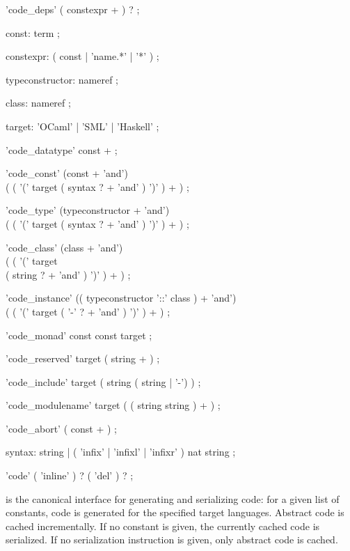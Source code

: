 \begin{isabellebody}
\begin{isamarkuptext}
\begin{rail}
    'code\_deps' ( constexpr + ) ?
    ;

    const: term
    ;

    constexpr: ( const | 'name.*' | '*' )
    ;

    typeconstructor: nameref
    ;

    class: nameref
    ;

    target: 'OCaml' | 'SML' | 'Haskell'
    ;

    'code\_datatype' const +
    ;

    'code\_const' (const + 'and') \\
      ( ( '(' target ( syntax ? + 'and' ) ')' ) + )
    ;

    'code\_type' (typeconstructor + 'and') \\
      ( ( '(' target ( syntax ? + 'and' ) ')' ) + )
    ;

    'code\_class' (class + 'and') \\
      ( ( '(' target \\ ( string ? + 'and' ) ')' ) + )
    ;

    'code\_instance' (( typeconstructor '::' class ) + 'and') \\
      ( ( '(' target ( '-' ? + 'and' ) ')' ) + )
    ;

    'code\_monad' const const target
    ;

    'code\_reserved' target ( string + )
    ;

    'code\_include' target ( string ( string | '-') )
    ;

    'code\_modulename' target ( ( string string ) + )
    ;

    'code\_abort' ( const + )
    ;

    syntax: string | ( 'infix' | 'infixl' | 'infixr' ) nat string
    ;

    'code' ( 'inline' ) ? ( 'del' ) ?
    ;
  \end{rail}

  \begin{description}

  \item \hyperlink{command.HOL.export-code}{\mbox{}} is the canonical interface for
  generating and serializing code: for a given list of constants, code
  is generated for the specified target languages.  Abstract code is
  cached incrementally.  If no constant is given, the currently cached
  code is serialized.  If no serialization instruction is given, only
  abstract code is cached.


\end{description}
\end{isamarkuptext}
\end{isabellebody}
